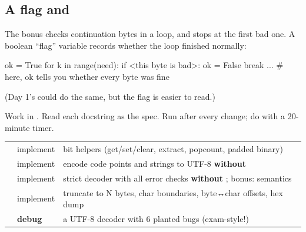 \documentclass[10pt,a4paper]{article}
\begin{document}
\subsection{A flag and }
The bonus  checks continuation bytes in a loop, and stops at the first bad one. A boolean “flag” variable records whether the loop finished normally:
\begin{pycode}
ok = True
for k in range(need):
    if <this byte is bad>:
        ok = False
        break
    ...
# here, ok tells you whether every byte was fine
\end{pycode}
(Day 1’s  could do the same, but the flag is easier to read.)
\begin{practicebox}
Work in . Read each docstring as the spec. Run  after every change; do  with a 20-minute timer.
\end{practicebox}
\begin{datatable}{}{\footnotesize}
\begin{xltabular}{\linewidth}{@{}Y{1.33}Y{0.58}Y{1.09}@{}}
 &  &  \\ \hline
\endhead
{} & implement & bit helpers (get/set/clear, extract, popcount, padded binary) \\
 & implement & encode code points and strings to UTF-8 \textbf{without}  \\
 & implement & strict decoder with all error checks \textbf{without} ; bonus:  semantics \\
 & implement & truncate to N bytes, char boundaries, byte↔char offsets, hex dump \\
 & \textbf{debug} & a UTF-8 decoder with 6 planted bugs (exam-style!) \\
\hline
\end{xltabular}
\end{datatable}
\end{document}
